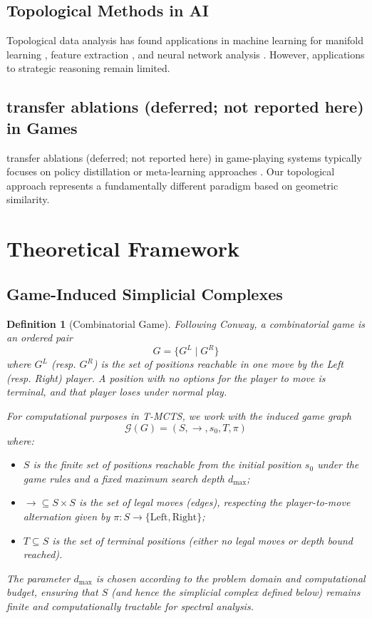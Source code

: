 \documentclass{article}
\newtheorem{definition}{Definition}
\begin{document}
\subsection{Topological Methods in AI}
Topological data analysis has found applications in machine learning for manifold learning \citep{carlsson2009topology}, feature extraction \citep{adams2017persistence}, and neural network analysis \citep{rieck2019neural}. However, applications to strategic reasoning remain limited.

\subsection{transfer ablations (deferred; not reported here) in Games}
transfer ablations (deferred; not reported here) in game-playing systems typically focuses on policy distillation \citep{rusu2016policy} or meta-learning approaches \citep{duan2016rl}. Our topological approach represents a fundamentally different paradigm based on geometric similarity.

\section{Theoretical Framework}

\subsection{Game-Induced Simplicial Complexes}

\begin{definition}[Combinatorial Game]
Following Conway, a combinatorial game is an ordered pair
\[
G = \{ G^L \mid G^R \}
\]
where $G^L$ (resp. $G^R$) is the set of positions reachable in one move by the Left (resp. Right) player. A position with no options for the player to move is terminal, and that player loses under normal play.

For computational purposes in T-MCTS, we work with the \emph{induced game graph}
\[
\mathcal{G}(G) = (S, \to, s_0, T, \pi)
\]
where:
\begin{itemize}
\item $S$ is the finite set of positions reachable from the initial position $s_0$ under the game rules and a fixed maximum search depth $d_{\max}$;
\item $\to \subseteq S \times S$ is the set of legal moves (edges), respecting the player-to-move alternation given by $\pi: S \to \{\text{Left}, \text{Right}\}$;
\item $T \subseteq S$ is the set of terminal positions (either no legal moves or depth bound reached).
\end{itemize}
The parameter $d_{\max}$ is chosen according to the problem domain and computational budget, ensuring that $S$ (and hence the simplicial complex defined below) remains finite and computationally tractable for spectral analysis.
\end{definition}
\end{document}
